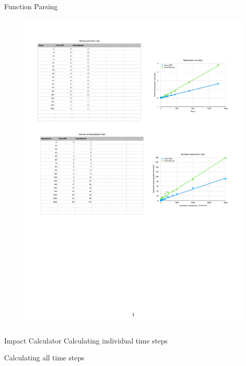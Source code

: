 \begin{frame}{Function Parsing}
    \begin{figure}
        \centering
        \includegraphics[page=2, width = 0.9\linewidth]{.figures/FunctionParsingTimes.pdf}
    \end{figure}
\end{frame}

\begin{frame}{Impact Calculator}
Calculating individual time steps

Calculating all time steps
\end{frame}

